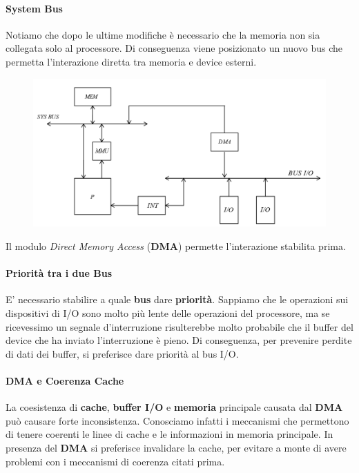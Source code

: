 \documentclass{article}
\begin{document}
\newpage

\paragraph{System Bus} Notiamo che dopo le ultime modifiche è necessario che la memoria non sia collegata solo al processore. Di conseguenza viene posizionato un nuovo bus che permetta l'interazione diretta tra memoria e device esterni.

\begin{figure}[htbp]
        \center
        \includegraphics[scale=0.45]{img/bus_sys.png}
    \end{figure}

Il modulo \textit{Direct Memory Access} (\textbf{DMA}) permette l'interazione stabilita prima.

\paragraph{Priorità tra i due Bus} E' necessario stabilire a quale \textbf{bus} dare \textbf{priorità}. Sappiamo che le operazioni sui dispositivi di I/O sono molto più lente delle operazioni del processore, ma se ricevessimo un segnale d'interruzione risulterebbe molto probabile che il buffer del device che ha inviato l'interruzione è pieno. Di conseguenza, per prevenire perdite di dati dei buffer, si preferisce dare priorità al bus I/O.

\paragraph{DMA e Coerenza Cache} La coesistenza di \textbf{cache}, \textbf{buffer I/O} e \textbf{memoria} principale causata dal \textbf{DMA} può causare forte inconsistenza. Conosciamo infatti i meccanismi che permettono di tenere coerenti le linee di cache e le informazioni in memoria principale. In presenza del \textbf{DMA} si preferisce invalidare la cache, per evitare a monte di avere problemi con i meccanismi di coerenza citati prima.
\end{document}
